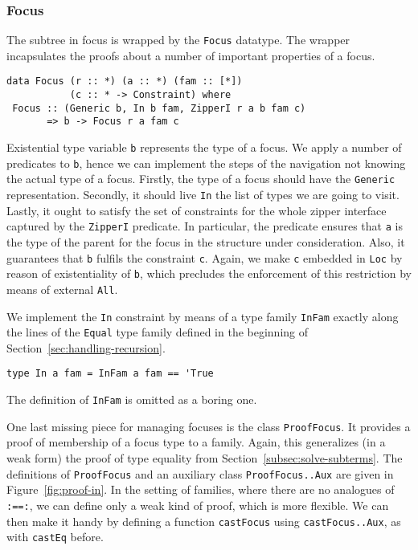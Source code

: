 \documentclass[runningheads]{llncs}
\newcommand{\K}[1]{\lstinline[style=fancy]{#1}}
\begin{document}
\subsubsection{Focus}

The subtree in focus is wrapped by the \K{Focus} datatype. 
The wrapper incapsulates the proofs about a number of important properties of a focus.
\begin{lstlisting}[style=fancy]
data Focus (r :: *) (a :: *) (fam :: [*])
           (c :: * -> Constraint) where
 Focus :: (Generic b, In b fam, ZipperI r a b fam c)
       => b -> Focus r a fam c
\end{lstlisting}
Existential type variable \K{b} represents the type of a focus. We apply a number of predicates to \K{b}, hence we can implement the steps of the navigation not knowing the actual type of a focus. Firstly, the type of a focus should have the \K{Generic} representation. Secondly, it should live \K{In} the list of types we are going to visit. Lastly, it ought to satisfy the set of constraints for the whole zipper interface captured by the \K{ZipperI} predicate. In particular, the predicate ensures that \K{a} is the type of the parent for the focus in the structure under consideration. Also, it guarantees that \K{b} fulfils the constraint \K{c}. Again, we make \K{c} embedded in \K{Loc} by reason of existentiality of \K{b}, which precludes the enforcement of this restriction by means of external \K{All}.

We implement the \K{In} constraint by means of a type family \K{InFam} exactly along the lines of the \K{Equal} type family defined in the beginning of Section~\ref{sec:handling-recursion}. 
\begin{lstlisting}[style=fancy]
type In a fam = InFam a fam == 'True
\end{lstlisting}
The definition of \K{InFam} is omitted as a boring one.

One last missing piece for managing focuses is the class \K{ProofFocus}. It provides a proof of membership of a focus type to a family. Again, this generalizes (in a weak form) the proof of type equality from Section~\ref{subsec:solve-subterms}. The definitions of \K{ProofFocus} and an auxiliary class \K{ProofFocus..Aux} are given in Figure~\ref{fig:proof-in}. In the setting of families, where there are no analogues of \K{:==:}, we can define only a weak kind of proof, which is more flexible. We can then make it handy by defining a function \K{castFocus} using \K{castFocus..Aux}, as with \K{castEq} before.
\end{document}
